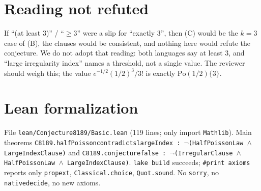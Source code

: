 \documentclass[11pt]{article}
\renewcommand{\_}{\oldus\allowbreak}
\theoremstyle{definition}
\theoremstyle{remark}
\begin{document}
\section{Reading not refuted}

If ``(at least 3)'' / ``$\ge 3$'' were a slip for ``exactly 3'', then (C) would be the $k=3$ case of (B),
the clauses would be consistent, and nothing here would refute the conjecture. We do not adopt that reading:
both languages say at least $3$, and ``large irregularity index'' names a threshold, not a single value.
The reviewer should weigh this; the value $e^{-1/2}(1/2)^3/3!$ is exactly $\mathrm{Po}(1/2)\{3\}$.

\section{Lean formalization}

File \texttt{lean/Conjecture8189/Basic.lean} (119 lines; only import \texttt{Mathlib}). Main theorems
\texttt{C8189.halfPoisson\_contradicts\_largeIndex : }$\neg$\texttt{(HalfPoissonLaw }$\wedge$\texttt{
LargeIndexClause)} and \texttt{C8189.conjecture\_8189\_false : }$\neg$\texttt{(IrregularClause }$\wedge$\texttt{
HalfPoissonLaw }$\wedge$\texttt{ LargeIndexClause)}. \texttt{lake build} succeeds; \texttt{\#print axioms}
reports only \texttt{propext}, \texttt{Classical.choice}, \texttt{Quot.sound}. No \texttt{sorry}, no
\texttt{native\_decide}, no new axioms.
\end{document}
